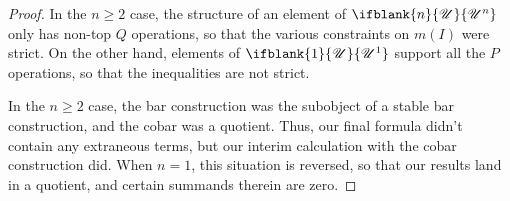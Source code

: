 \documentclass[10pt]{article}
\makeatletter
\newcommand{\nontop}[1]{\ifblank{#1}{\scrU}{\scrU^{#1}}}
\newcommand{\produces}[3]{{#1}{#3}{#2}}
\renewcommand{\Q}{Q}
\newcommand{\minDim}{m}
\newcommand{\minDimP}{\overline{m}}
\renewcommand{\produces}[3]{
{
\def\labelstyle{\scriptstyle}
\xymatrix@C=2em@1{
{#1}
\ar@{-}[r]|-{{\,#3\,}}
&%
{#2}%
}}}
\makeatother
\begin{document}
\begin{KoszulComplexes1}
\begin{proof}
In the $n\geq2$ case, the structure of an element of $\nontop{n}$ only has non-top $\Q$ operations, so that the various constraints on $\minDim(I)$ were strict. On the other hand, elements of $\nontop{1}$ support all the $P$ operations, so that the inequalities are not strict.

In the $n\geq2$ case, the bar construction was the subobject of a stable bar construction, and the cobar was a quotient. Thus, our final formula didn't contain any extraneous terms, but our interim calculation with the cobar construction did. When $n=1$, this situation is reversed, so that our results land in a quotient, and certain summands therein are zero.
%
\end{proof}
\end{KoszulComplexes1}
\end{document}
